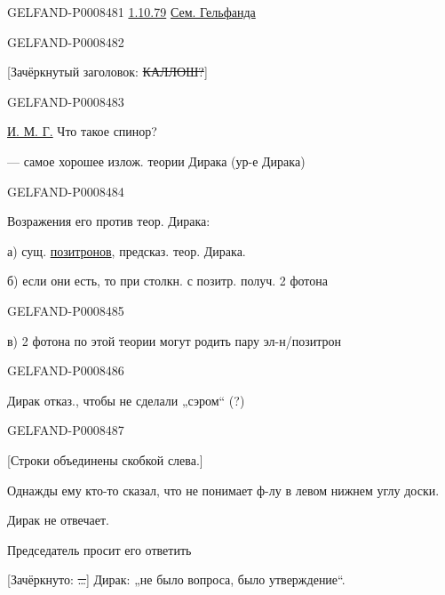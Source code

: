 \begin{GelfandAdjacentEvidence}{GELFAND-P000848}{1}
\uline{1.10.79} \qquad \uline{Сем. Гельфанда}
\end{GelfandAdjacentEvidence}
\begin{GelfandAdjacentEvidence}{GELFAND-P000848}{2}


[Зачёркнутый заголовок: \sout{КАЛЛОШ?}]
\end{GelfandAdjacentEvidence}
\begin{GelfandAdjacentEvidence}{GELFAND-P000848}{3}


\uline{И. М. Г.} Что такое спинор?

 — самое хорошее излож. теории Дирака (ур-е Дирака)
\end{GelfandAdjacentEvidence}
\begin{GelfandAdjacentEvidence}{GELFAND-P000848}{4}


Возражения его против теор. Дирака:

а) сущ. \uline{позитронов}, предсказ. теор. Дирака.

б) если они есть, то при столкн. с позитр. получ. 2 фотона
\end{GelfandAdjacentEvidence}
\begin{GelfandAdjacentEvidence}{GELFAND-P000848}{5}


в) 2 фотона по этой теории могут родить пару эл-н/позитрон
\end{GelfandAdjacentEvidence}
\begin{GelfandAdjacentEvidence}{GELFAND-P000848}{6}


Дирак отказ., чтобы не сделали „сэром“ (?)
\end{GelfandAdjacentEvidence}
\begin{GelfandAdjacentEvidence}{GELFAND-P000848}{7}


[Строки объединены скобкой слева.]

Однажды ему кто-то сказал, что не понимает ф-лу в левом нижнем углу доски.

Дирак не отвечает.

Председатель просит его ответить

[Зачёркнуто: \sout{…}] Дирак: „не было вопроса, было утверждение“.
\end{GelfandAdjacentEvidence}
